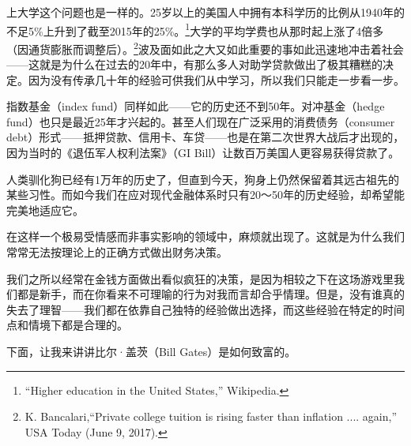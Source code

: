 上大学这个问题也是一样的。25岁以上的美国人中拥有本科学历的比例从1940年的不足5\%上升到了截至2015年的25\%。\footnote{“Higher education in the United States,” Wikipedia.}大学的平均学费也从那时起上涨了4倍多（因通货膨胀而调整后）。\footnote{K. Bancalari,“Private college tuition is rising faster than inflation .... again,” USA Today (June 9, 2017).}波及面如此之大又如此重要的事如此迅速地冲击着社会——这就是为什么在过去的20年中，有那么多人对助学贷款做出了极其糟糕的决定。因为没有传承几十年的经验可供我们从中学习，所以我们只能走一步看一步。

指数基金（index fund）同样如此——它的历史还不到50年。对冲基金（hedge fund）也只是最近25年才兴起的。甚至人们现在广泛采用的消费债务（consumer debt）形式——抵押贷款、信用卡、车贷——也是在第二次世界大战后才出现的，因为当时的《退伍军人权利法案》（GI Bill）让数百万美国人更容易获得贷款了。

人类驯化狗已经有1万年的历史了，但直到今天，狗身上仍然保留着其远古祖先的某些习性。而如今我们在应对现代金融体系时只有20～50年的历史经验，却希望能完美地适应它。

在这样一个极易受情感而非事实影响的领域中，麻烦就出现了。这就是为什么我们常常无法按理论上的正确方式做出财务决策。

我们之所以经常在金钱方面做出看似疯狂的决策，是因为相较之下在这场游戏里我们都是新手，而在你看来不可理喻的行为对我而言却合乎情理。但是，没有谁真的失去了理智——我们都在依靠自己独特的经验做出选择，而这些经验在特定的时间点和情境下都是合理的。

下面，让我来讲讲比尔·盖茨（Bill Gates）是如何致富的。

